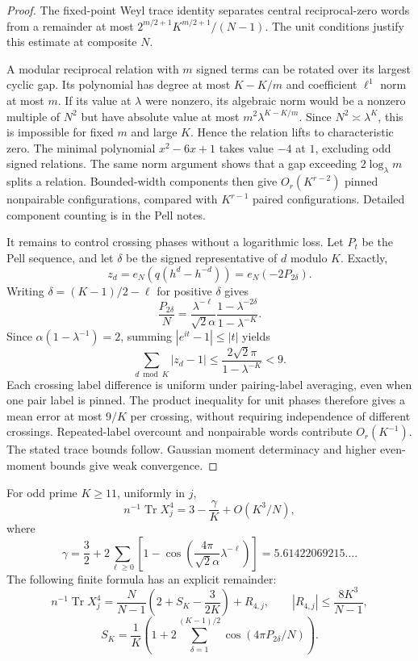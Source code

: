 \begin{proof}
The fixed-point Weyl trace identity separates central reciprocal-zero words
from a remainder at most $2^{m/2+1}K^{m/2+1}/(N-1)$. The unit conditions
justify this estimate at composite $N$.

A modular reciprocal relation with $m$ signed terms can be rotated over its
largest cyclic gap. Its polynomial has degree at most $K-K/m$ and coefficient
$\ell^1$ norm at most $m$. If its value at $\lambda$ were nonzero, its algebraic
norm would be a nonzero multiple of $N^2$ but have absolute value at most
$m^2\lambda^{K-K/m}$. Since $N^2\asymp\lambda^K$, this is impossible for
fixed $m$ and large $K$. Hence the relation lifts to characteristic zero.
The minimal polynomial $x^2-6x+1$ takes value $-4$ at $1$, excluding odd
signed relations. The same norm argument shows that a gap exceeding
$2\log_\lambda m$ splits a relation. Bounded-width components then give
$O_r(K^{r-2})$ pinned nonpairable configurations, compared with $K^{r-1}$
paired configurations. Detailed component counting is in the Pell notes.

It remains to control crossing phases without a logarithmic loss.
Let $P_t$ be the Pell sequence, and let $\delta$ be the signed representative
of $d$ modulo $K$. Exactly,
\[
 z_d=e_N(q(h^d-h^{-d}))=e_N(-2P_{2\delta}).
\]
Writing $\delta=(K-1)/2-\ell$ for positive $\delta$ gives
\[
 \frac{P_{2\delta}}{N}
 =\frac{\lambda^{-\ell}}{\sqrt2\alpha}
 \frac{1-\lambda^{-2\delta}}{1-\lambda^{-K}}.
\]
Since $\alpha(1-\lambda^{-1})=2$, summing $|e^{it}-1|\le|t|$ yields
\[
 \sum_{d\bmod K}|z_d-1|
 \le \frac{2\sqrt2\pi}{1-\lambda^{-K}}<9.
\]
Each crossing label difference is uniform under pairing-label averaging,
even when one pair label is pinned. The product inequality for unit phases
therefore gives a mean error at most $9/K$ per crossing, without requiring
independence of different crossings. Repeated-label overcount and
nonpairable words contribute $O_r(K^{-1})$. The stated trace bounds follow.
Gaussian moment determinacy and higher even-moment bounds give weak convergence.
\end{proof}

\begin{theorem}
For odd prime $K\ge11$, uniformly in $j$,
\[
 n^{-1}\operatorname{Tr} X_j^4=3-\frac{\gamma}{K}+O(K^3/N),
\]
where
\[
 \gamma=\frac32+2\sum_{\ell\ge0}
 \left[1-\cos\left(\frac{4\pi}{\sqrt2\alpha}\lambda^{-\ell}\right)\right]
 =5.61422069215\ldots.
\]
The following finite formula has an explicit remainder:
\[
 n^{-1}\operatorname{Tr} X_j^4=\frac{N}{N-1}\left(2+S_K-\frac{3}{2K}\right)+R_{4,j},
 \qquad |R_{4,j}|\le \frac{8K^3}{N-1},
\]
\[
 S_K=\frac1K\left(1+2\sum_{\delta=1}^{(K-1)/2}
                         \cos(4\pi P_{2\delta}/N)\right).
\]
\end{theorem}

